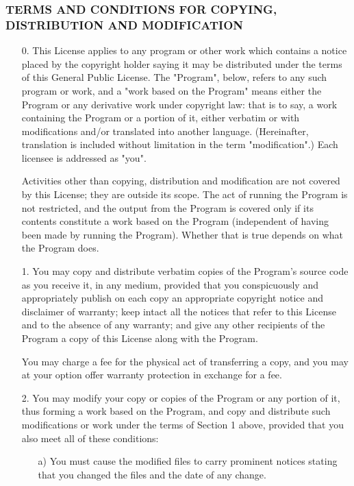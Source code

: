 \subsubsection*{TERMS AND CONDITIONS FOR COPYING, DISTRIBUTION AND MODIFICATION}
{\small
\begin{itemize}
\item[0.] This License applies to any program or other work which contains
  a notice placed by the copyright holder saying it may be distributed
  under the terms of this General Public License.  The "Program",
  below, refers to any such program or work, and a "work based on the
  Program" means either the Program or any derivative work under
  copyright law: that is to say, a work containing the Program or a
  portion of it, either verbatim or with modifications and/or
  translated into another language.  (Hereinafter, translation is
  included without limitation in the term "modification".)  Each
  licensee is addressed as "you".
  
  Activities other than copying, distribution and modification are not
  covered by this License; they are outside its scope.  The act of
  running the Program is not restricted, and the output from the
  Program is covered only if its contents constitute a work based on
  the Program (independent of having been made by running the
  Program).  Whether that is true depends on what the Program does.
  
\item[1.] You may copy and distribute verbatim copies of the Program's
  source code as you receive it, in any medium, provided that you
  conspicuously and appropriately publish on each copy an appropriate
  copyright notice and disclaimer of warranty; keep intact all the
  notices that refer to this License and to the absence of any
  warranty; and give any other recipients of the Program a copy of
  this License along with the Program.
  
  You may charge a fee for the physical act of transferring a copy,
  and you may at your option offer warranty protection in exchange for
  a fee.
  
\item[2.] You may modify your copy or copies of the Program or any portion
  of it, thus forming a work based on the Program, and copy and
  distribute such modifications or work under the terms of Section 1
  above, provided that you also meet all of these conditions:
  
  \begin{itemize}
  \item[a)] You must cause the modified files to carry prominent notices
    stating that you changed the files and the date of any change.
  

\end{itemize}
\end{itemize}}
